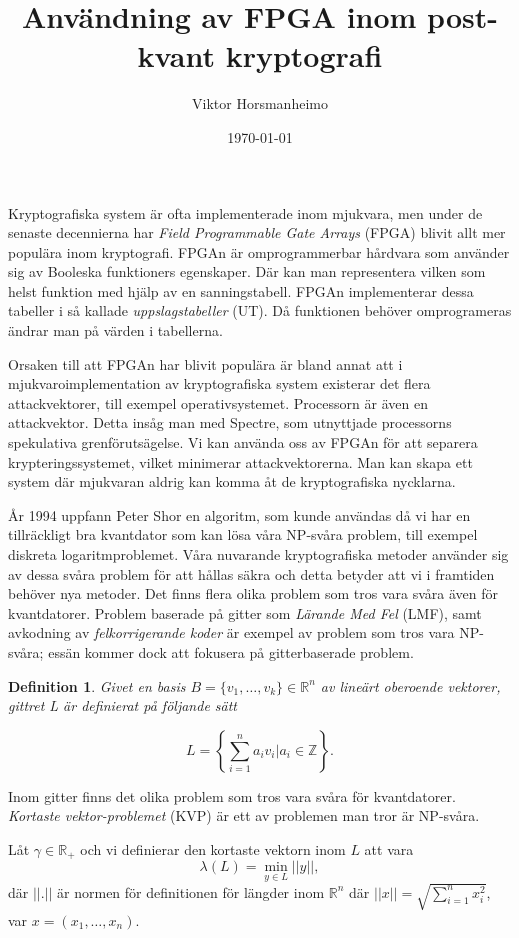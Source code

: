 \documentclass{paper}
\title{Användning av FPGA inom post-kvant kryptografi}
\author{Viktor Horsmanheimo}
\date{\today}
\newtheorem{definition}{Definition}
\newcommand{\bR}{\mathbb{R}}
\newcommand{\bZ}{\mathbb{Z}}
\begin{document}
\maketitle

Kryptografiska system är ofta implementerade inom mjukvara, men under de
senaste decennierna har \textit{Field Programmable Gate Arrays} (FPGA) blivit
allt mer populära inom kryptografi. FPGAn är omprogrammerbar hårdvara som
använder sig av Booleska funktioners egenskaper. Där kan man representera
vilken som helst funktion med hjälp av en sanningstabell. FPGAn implementerar
dessa tabeller i så kallade \textit{uppslagstabeller} (UT). Då funktionen behöver
omprogrameras ändrar man på värden i tabellerna.

Orsaken till att FPGAn har blivit populära är bland annat att i
mjukvaroimplementation av kryptografiska system existerar det flera
attackvektorer, till exempel operativsystemet. Processorn är även en
attackvektor. Detta insåg man med Spectre, som utnyttjade processorns
spekulativa grenförutsägelse. Vi kan använda oss av FPGAn för att separera
krypteringssystemet, vilket minimerar attackvektorerna. Man kan skapa ett
system där mjukvaran aldrig kan komma åt de kryptografiska nycklarna.

År 1994 uppfann Peter Shor en algoritm, som kunde användas då vi har en
tillräckligt bra kvantdator som kan lösa våra NP-svåra problem, till exempel
diskreta logaritmproblemet. Våra nuvarande kryptografiska metoder använder sig
av dessa svåra problem för att hållas säkra och detta betyder att vi i
framtiden behöver nya metoder. Det finns flera olika problem som tros vara
svåra även för kvantdatorer. Problem baserade på gitter som \textit{Lärande Med
Fel} (LMF), samt avkodning av \textit{felkorrigerande koder} är exempel av
problem som tros vara NP-svåra; essän kommer dock att fokusera på
gitterbaserade problem.

\begin{definition}
    Givet en basis $B = \{v_1, \ldots, v_k\} \in \bR^n$ av lineärt
    oberoende vektorer, gittret L är definierat på följande sätt

    \[L = \left\{ \sum_{i=1}^n a_i v_i | a_i \in \bZ \right\}.\]

\end{definition}
Inom gitter finns det olika problem som tros vara svåra för kvantdatorer.
\textit{Kortaste vektor-problemet} (KVP) är ett av problemen man tror är NP-svåra.

Låt $\gamma \in \bR_+$ och vi definierar den kortaste vektorn inom $L$ att vara
\[\lambda (L) = \min_{y \in L} ||y||,\]
där $||.||$ är normen för definitionen för längder inom $\bR^n$ där $||x|| =
\sqrt{\sum_{i = 1}^n x_i^2}$, var $x = (x_1, \ldots, x_n)$.
\end{document}
